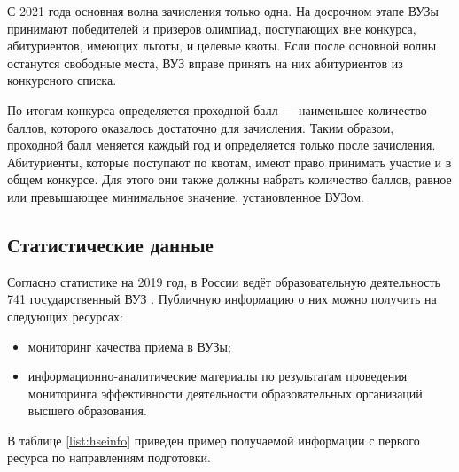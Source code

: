 С 2021 года основная волна зачисления только одна\cite{prikaz1}. На досрочном этапе ВУЗы принимают победителей и призеров олимпиад, поступающих вне конкурса, абитуриентов, имеющих льготы, и целевые квоты. Если после основной волны останутся свободные места, ВУЗ вправе принять на них абитуриентов из конкурсного списка.

По итогам конкурса определяется проходной балл — наименьшее количество баллов, которого оказалось достаточно для зачисления. Таким образом, проходной балл меняется каждый год и определяется только после зачисления. Абитуриенты, которые поступают по квотам, имеют право принимать участие и в общем конкурсе. Для этого они также должны набрать количество баллов, равное или превышающее минимальное значение, установленное ВУЗом.

\subsection{Статистические данные}

Согласно статистике на 2019 год, в России ведёт образовательную деятельность 741 государственный ВУЗ \cite{stat}. Публичную информацию о них можно получить на следующих ресурсах:

\begin{itemize}[leftmargin=1.6\parindent]
	\item мониторинг качества приема в ВУЗы\cite{hse};
	\item информационно-аналитические материалы по результатам проведения мониторинга
эффективности деятельности образовательных организаций высшего образования\cite{miccedu}.

\end{itemize}

В таблице \ref{list:hseinfo} приведен пример получаемой информации с первого ресурса по направлениям подготовки.

